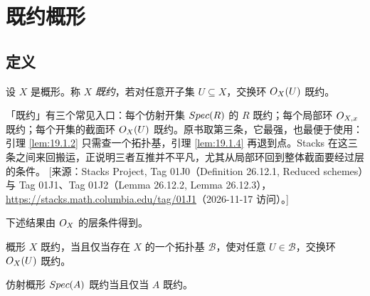 
\makeatletter
{}
\makeatother

\section{既约概形}\label{sec:19}

\subsection{定义}\label{sec:19.1}

\begin{definition}\label{def:19.1.1}
设 $X$ 是概形。称 $X$ \emph{既约}，若对任意开子集 $U\subseteq X$，交换环 $O_X(U)$ 既约。
\end{definition}

\begin{yizhu}
「既约」有三个常见入口：每个仿射开集 $Spec(R)$ 的 $R$ 既约；每个局部环 $O_{X,x}$ 既约；每个开集的截面环 $O_X(U)$ 既约。原书取第三条，它最强，也最便于使用：引理 \ref{lem:19.1.2} 只需查一个拓扑基，引理 \ref{lem:19.1.4} 再退到点。Stacks 在这三条之间来回搬运，正说明三者互推并不平凡，尤其从局部环回到整体截面要经过层的条件。
[来源：Stacks Project, Tag 01J0（Definition 26.12.1, Reduced schemes）与 Tag 01J1、Tag 01J2（Lemma 26.12.2, Lemma 26.12.3），\url{https://stacks.math.columbia.edu/tag/01J1}（2026-11-17 访问）。]
\end{yizhu}

下述结果由 $O_X$ 的层条件得到。

\begin{lemma}\label{lem:19.1.2}
概形 $X$ 既约，当且仅当存在 $X$ 的一个拓扑基 $\mathcal{B}$，使对任意 $U\in\mathcal{B}$，交换环 $O_X(U)$ 既约。
\end{lemma}

\begin{corollary}\label{cor:19.1.3}
仿射概形 $Spec(A)$ 既约当且仅当 $A$ 既约。
\end{corollary}

